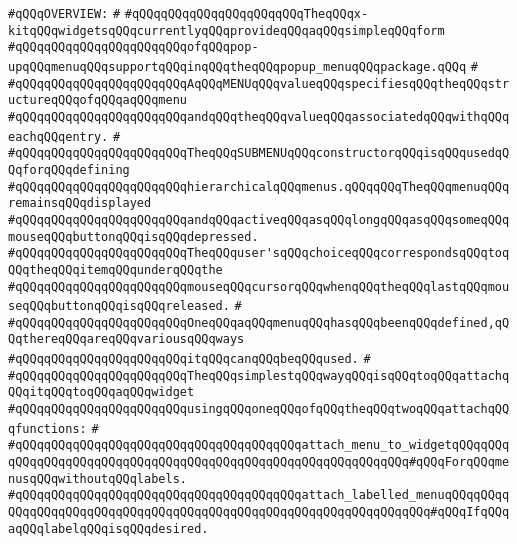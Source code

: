 \newline
\verb|#qQQqOVERVIEW:|\newline
\verb|#|\newline
\verb|#qQQqqQQqqQQqqQQqqQQqqQQqTheqQQqx-kitqQQqwidgetsqQQqcurrentlyqQQqprovideqQQqaqQQqsimpleqQQqform|\newline
\verb|#qQQqqQQqqQQqqQQqqQQqqQQqofqQQqpop-upqQQqmenuqQQqsupportqQQqinqQQqtheqQQqpopup_menuqQQqpackage.qQQq|\newline
\verb|#|\newline
\verb|#qQQqqQQqqQQqqQQqqQQqqQQqAqQQqMENUqQQqvalueqQQqspecifiesqQQqtheqQQqstructureqQQqofqQQqaqQQqmenu|\newline
\verb|#qQQqqQQqqQQqqQQqqQQqqQQqandqQQqtheqQQqvalueqQQqassociatedqQQqwithqQQqeachqQQqentry.|\newline
\verb|#|\newline
\verb|#qQQqqQQqqQQqqQQqqQQqqQQqTheqQQqSUBMENUqQQqconstructorqQQqisqQQqusedqQQqforqQQqdefining|\newline
\verb|#qQQqqQQqqQQqqQQqqQQqqQQqhierarchicalqQQqmenus.qQQqqQQqTheqQQqmenuqQQqremainsqQQqdisplayed|\newline
\verb|#qQQqqQQqqQQqqQQqqQQqqQQqandqQQqactiveqQQqasqQQqlongqQQqasqQQqsomeqQQqmouseqQQqbuttonqQQqisqQQqdepressed.|\newline
\verb|#qQQqqQQqqQQqqQQqqQQqqQQqTheqQQquser'sqQQqchoiceqQQqcorrespondsqQQqtoqQQqtheqQQqitemqQQqunderqQQqthe|\newline
\verb|#qQQqqQQqqQQqqQQqqQQqqQQqmouseqQQqcursorqQQqwhenqQQqtheqQQqlastqQQqmouseqQQqbuttonqQQqisqQQqreleased.|\newline
\verb|#|\newline
\verb|#qQQqqQQqqQQqqQQqqQQqqQQqOneqQQqaqQQqmenuqQQqhasqQQqbeenqQQqdefined,qQQqthereqQQqareqQQqvariousqQQqways|\newline
\verb|#qQQqqQQqqQQqqQQqqQQqqQQqitqQQqcanqQQqbeqQQqused.|\newline
\verb|#|\newline
\verb|#qQQqqQQqqQQqqQQqqQQqqQQqTheqQQqsimplestqQQqwayqQQqisqQQqtoqQQqattachqQQqitqQQqtoqQQqaqQQqwidget|\newline
\verb|#qQQqqQQqqQQqqQQqqQQqqQQqusingqQQqoneqQQqofqQQqtheqQQqtwoqQQqattachqQQqfunctions:|\newline
\verb|#|\newline
\verb|#qQQqqQQqqQQqqQQqqQQqqQQqqQQqqQQqqQQqqQQqattach_menu_to_widgetqQQqqQQqqQQqqQQqqQQqqQQqqQQqqQQqqQQqqQQqqQQqqQQqqQQqqQQqqQQqqQQq#qQQqForqQQqmenusqQQqwithoutqQQqlabels.|\newline
\verb|#qQQqqQQqqQQqqQQqqQQqqQQqqQQqqQQqqQQqqQQqattach_labelled_menuqQQqqQQqqQQqqQQqqQQqqQQqqQQqqQQqqQQqqQQqqQQqqQQqqQQqqQQqqQQqqQQqqQQq#qQQqIfqQQqaqQQqlabelqQQqisqQQqdesired.|\newline
